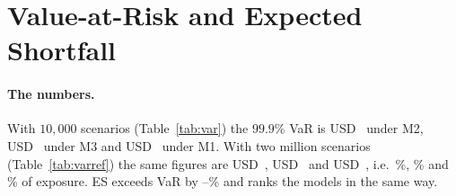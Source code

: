\section{Value-at-Risk and Expected Shortfall}
\label{sec:results}


\begin{table}[tb]
\caption{Question (viii), baseline run: $99.9\%$ VaR and ES (USD) from $10{,}000$ scenarios, with the empirical-quantile thresholds $\hat d_k$ and with the reference thresholds $d_k$. Standard errors from 200 repetitions; last row: the difference M3 $-$ M2. The expected loss is USD~ in all models.}
\label{tab:var}
\centering
{}
\end{table}

\begin{table}[tb]
\caption{Reference run: VaR, ES and unexpected loss (UL $=$ VaR $-$ EL), USD, two million scenarios. ``\% exp.'': VaR in per cent of total exposure. Standard errors of the M3 $-$ M2 difference in parentheses.}
\label{tab:varref}
\centering
{}
\end{table}

\paragraph{The numbers.}
With $10{,}000$ scenarios (Table~\ref{tab:var}) the $99.9\%$ VaR is USD~ under M2, USD~ under M3 and USD~ under M1. With two million scenarios (Table~\ref{tab:varref}) the same figures are USD~, USD~ and USD~, i.e.\ \%, \% and \% of exposure. ES exceeds VaR by --\% and ranks the models in the same way.

